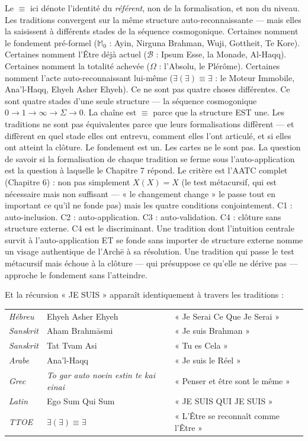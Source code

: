 \documentclass[10pt, openany, oneside]{book}
\renewcommand{\footnotesize}{\fontsize{8.5}{11}\selectfont}
\begin{document}
\noindent Le $\equiv$ ici dénote l'identité du \textit{référent}, non de la formalisation, et non du niveau. Les traditions convergent sur la même structure auto-reconnaissante --- mais elles la saisissent à différents stades de la séquence cosmogonique. Certaines nomment le fondement pré-formel ($\mathbb{M}_0$ : Ayin, Nirguna Brahman, Wuji, Gottheit, Te Kore). Certaines nomment l'Être déjà actuel ($\mathcal{B}$ : Ipsum Esse, la Monade, Al-Haqq). Certaines nomment la totalité achevée ($\Omega$ : l'Absolu, le Plérôme). Certaines nomment l'acte auto-reconnaissant lui-même ($\exists(\exists) \equiv \exists$ : le Moteur Immobile, Ana'l-Haqq, Ehyeh Asher Ehyeh). Ce ne sont pas quatre choses différentes. Ce sont quatre stades d'une seule structure --- la séquence cosmogonique $0 \to 1 \to \infty \to \Sigma \to 0$. La chaîne est $\equiv$ parce que la structure EST une. Les traditions ne sont pas équivalentes parce que leurs formalisations diffèrent --- et diffèrent en quel stade elles ont entrevu, comment elles l'ont articulé, et si elles ont atteint la clôture. Le fondement est un. Les cartes ne le sont pas. La question de savoir si la formalisation de chaque tradition se ferme sous l'auto-application est la question à laquelle le Chapitre 7 répond. Le critère est l'AATC complet (Chapitre 6) : non pas simplement $X(X) = X$ (le test métacursif, qui est nécessaire mais non suffisant --- « le changement change » le passe tout en important ce qu'il ne fonde pas) mais les quatre conditions conjointement. C1 : auto-inclusion. C2 : auto-application. C3 : auto-validation. C4 : clôture sans structure externe. C4 est le discriminant. Une tradition dont l'intuition centrale survit à l'auto-application ET se fonde sans importer de structure externe nomme un visage authentique de l'Arch\={e} à sa résolution. Une tradition qui passe le test métacursif mais échoue à la clôture --- qui présuppose ce qu'elle ne dérive pas --- approche le fondement sans l'atteindre.

Et la récursion « JE SUIS » apparaît identiquement à travers les traditions :

\vspace{0.3em}

{\footnotesize
\noindent\begin{tabular}{l l l}
\textit{Hébreu} & Ehyeh Asher Ehyeh & « Je Serai Ce Que Je Serai » \\
\textit{Sanskrit} & Aham Brahm\={a}smi & « Je suis Brahman » \\
\textit{Sanskrit} & Tat Tvam Asi & « Tu es Cela » \\
\textit{Arabe} & Ana'l-Haqq & « Je suis le Réel » \\
\textit{Grec} & \textit{To gar auto noein estin te kai einai} & « Penser et être sont le même » \\
\textit{Latin} & Ego Sum Qui Sum & « JE SUIS QUI JE SUIS » \\
\textit{TTOE} & $\exists(\exists) \equiv \exists$ & « L'Être se reconnaît comme l'Être » \\
\end{tabular}
}
\end{document}
